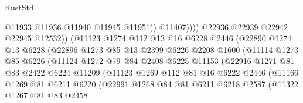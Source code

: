 \begin{lexlean}{RustStd}
\begin{coremodule}
                                    @11933
                                    @11936
                                    @11940
                                    @11945
                                    @11951))
                                @11407))))
                        @22936
                        @22939
                        @22942
                        @22945
                        @12532))
                    (@11123
                      @1274
                      @112
                      @13
                      @16
                      @6228
                      @2446
                      (@22890
                        @1274
                        @13
                        @6228
                        (@22896
                          @1273
                          @85
                          @13
                          @2399
                          @6226
                          @2208
                          @1600
                          (@11114
                            @1273
                            @85
                            @6226
                            (@11124
                              @1272
                              @79
                              @84
                              @2408
                              @6225
                              @11153
                              (@22916
                                @1271
                                @81
                                @83
                                @2422
                                @6224
                                @11209
                                (@11123
                                  @1269
                                  @112
                                  @81
                                  @16
                                  @6222
                                  @2446
                                  (@11166
                                    @1269
                                    @81
                                    @6211
                                    @6220
                                    (@22991
                                      @1268
                                      @84
                                      @81
                                      @6211
                                      @6218
                                      @2587
                                      (@11322
                                        @1267
                                        @81
                                        @83
                                        @2458

\end{coremodule}
\end{lexlean}
